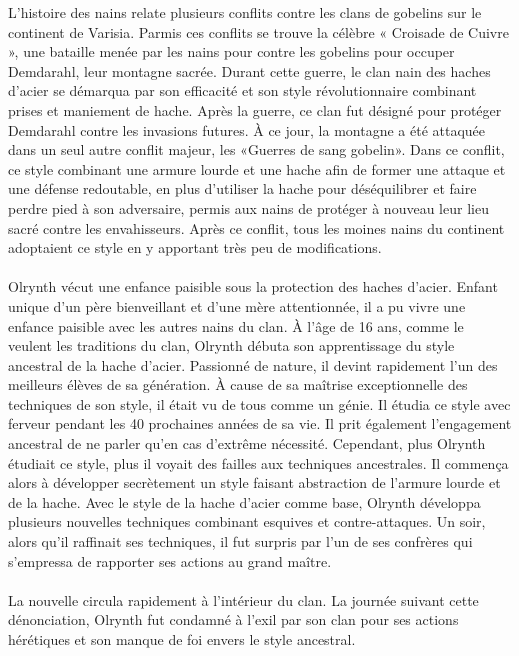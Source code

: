 \documentclass[main.tex]{subfiles}
\begin{document}
    L'histoire des nains relate plusieurs conflits contre les clans de gobelins sur le continent de Varisia.
    Parmis ces conflits se trouve la célèbre « Croisade de Cuivre », une bataille menée par les nains pour contre les gobelins pour occuper Demdarahl, leur montagne sacrée.
    Durant cette guerre, le clan nain des haches d'acier se démarqua par son efficacité et son style révolutionnaire combinant prises et maniement de hache.
    Après la guerre, ce clan fut désigné pour protéger Demdarahl contre les invasions futures.
    À ce jour, la montagne a été attaquée dans un seul autre conflit majeur, les «Guerres de sang gobelin». 
    Dans ce conflit, ce style combinant une armure lourde et une hache afin de former une attaque et une défense redoutable, 
    en plus d'utiliser la hache pour déséquilibrer et faire perdre pied à son adversaire, permis aux nains de protéger à nouveau leur lieu sacré contre les envahisseurs.
    Après ce conflit, tous les moines nains du continent adoptaient ce style en y apportant très peu de modifications.\\
    \\
    Olrynth vécut une enfance paisible sous la protection des haches d'acier.
    Enfant unique d'un père bienveillant et d'une mère attentionnée, il a pu vivre une enfance paisible avec les autres nains du clan.
    À l'âge de 16 ans, comme le veulent les traditions du clan, Olrynth débuta son apprentissage du style ancestral de la hache d'acier.
    Passionné de nature, il devint rapidement l'un des meilleurs élèves de sa génération.
    À cause de sa maîtrise exceptionnelle des techniques de son style, il était vu de tous comme un génie.
    Il étudia ce style avec ferveur pendant les 40 prochaines années de sa vie.
    Il prit également l'engagement ancestral de ne parler qu'en cas d'extrême nécessité.
    Cependant, plus Olrynth étudiait ce style, plus il voyait des failles aux techniques ancestrales. 
    Il commença alors à développer secrètement un style faisant abstraction de l'armure lourde et de la hache. 
    Avec le style de la hache d'acier comme base, Olrynth développa plusieurs nouvelles techniques combinant esquives et contre-attaques.
    Un soir, alors qu'il raffinait ses techniques, il fut surpris par l'un de ses confrères qui s'empressa de rapporter ses actions au grand maître.\\
    \\
    La nouvelle circula rapidement à l'intérieur du clan. 
    La journée suivant cette dénonciation, Olrynth fut condamné à l'exil par son clan pour ses actions hérétiques et son manque de foi envers le style ancestral.
\end{document}
